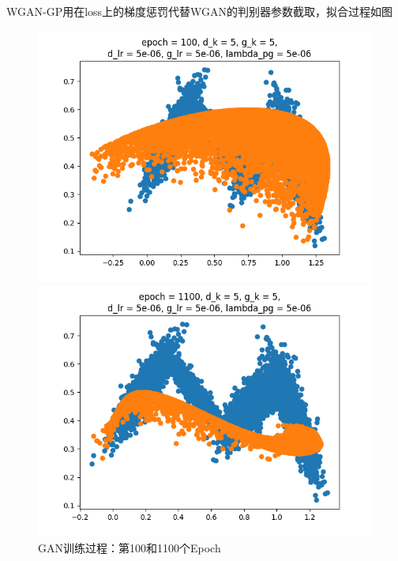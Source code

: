 \documentclass{article}
\begin{document}
WGAN-GP用在loss上的梯度惩罚代替WGAN的判别器参数截取，拟合过程如图

\begin{figure}[H]
    \begin{minipage}[H]{0.5\linewidth}
        \centering
        \includegraphics[width=\textwidth]{figures/WGANGP_0100.png}
    \end{minipage}
    \begin{minipage}[H]{0.5\linewidth}
        \centering
        \includegraphics[width=\textwidth]{figures/WGANGP_1100.png}
    \end{minipage}
    \caption{GAN训练过程：第100和1100个Epoch}
\end{figure}
\end{document}
